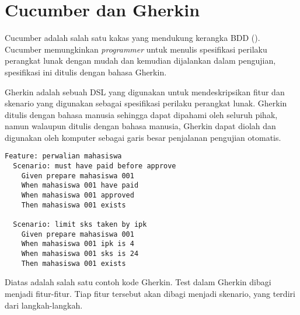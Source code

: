 \section{Cucumber dan Gherkin}

Cucumber adalah salah satu kakas yang mendukung kerangka BDD (\cite{cucumber_book}).
Cucumber memungkinkan \emph{programmer} untuk menulis spesifikasi
perilaku perangkat lunak dengan mudah dan kemudian dijalankan dalam pengujian,
spesifikasi ini ditulis dengan bahasa Gherkin.

Gherkin adalah sebuah DSL yang digunakan untuk mendeskripsikan fitur dan skenario
yang digunakan sebagai spesifikasi perilaku perangkat lunak. Gherkin ditulis
dengan bahasa manusia sehingga dapat dipahami oleh seluruh pihak, namun walaupun
ditulis dengan bahasa manusia, Gherkin dapat diolah dan digunakan oleh
komputer sebagai garis besar penjalanan pengujian otomatis.

\begin{lstlisting}[language=Gherkin]
Feature: perwalian mahasiswa
  Scenario: must have paid before approve
    Given prepare mahasiswa 001
    When mahasiswa 001 have paid
    When mahasiswa 001 approved
    Then mahasiswa 001 exists
  
  Scenario: limit sks taken by ipk
    Given prepare mahasiswa 001
    When mahasiswa 001 ipk is 4
    When mahasiswa 001 sks is 24
    Then mahasiswa 001 exists
\end{lstlisting}

Diatas adalah salah satu contoh kode Gherkin.
Test dalam Gherkin dibagi menjadi fitur-fitur. Tiap fitur tersebut akan dibagi menjadi
skenario, yang terdiri dari langkah-langkah.





